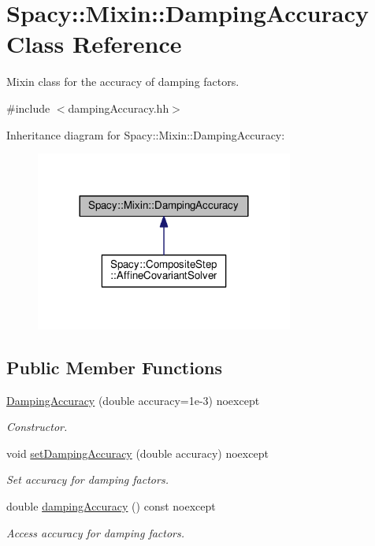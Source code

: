 \hypertarget{classSpacy_1_1Mixin_1_1DampingAccuracy}{}\section{Spacy\+:\+:Mixin\+:\+:Damping\+Accuracy Class Reference}
\label{classSpacy_1_1Mixin_1_1DampingAccuracy}


Mixin class for the accuracy of damping factors.  




{\ttfamily \#include $<$damping\+Accuracy.\+hh$>$}



Inheritance diagram for Spacy\+:\+:Mixin\+:\+:Damping\+Accuracy\+:\nopagebreak
\begin{figure}[H]
\begin{center}
\leavevmode
\includegraphics[width=240pt]{classSpacy_1_1Mixin_1_1DampingAccuracy__inherit__graph}
\end{center}
\end{figure}
\subsection*{Public Member Functions}
\begin{DoxyCompactItemize}
\item 
\hyperlink{classSpacy_1_1Mixin_1_1DampingAccuracy_a3cc2f537debc13218852ae8bfbcc4b37_a3cc2f537debc13218852ae8bfbcc4b37}{Damping\+Accuracy} (double accuracy=1e-\/3) noexcept
\begin{DoxyCompactList}\small\item\em Constructor. \end{DoxyCompactList}\item 
void \hyperlink{classSpacy_1_1Mixin_1_1DampingAccuracy_af934aaf17595b7029d9a8ecec2561599_af934aaf17595b7029d9a8ecec2561599}{set\+Damping\+Accuracy} (double accuracy) noexcept
\begin{DoxyCompactList}\small\item\em Set accuracy for damping factors. \end{DoxyCompactList}\item 
double \hyperlink{classSpacy_1_1Mixin_1_1DampingAccuracy_a070c4c1b64c4392c6b21478bcf4c4a75_a070c4c1b64c4392c6b21478bcf4c4a75}{damping\+Accuracy} () const noexcept
\begin{DoxyCompactList}\small\item\em Access accuracy for damping factors. \end{DoxyCompactList}\end{DoxyCompactItemize}


